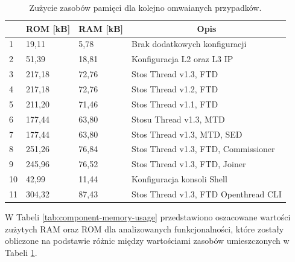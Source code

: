     \begin{table}[H]
        \centering
        \caption{Zużycie zasobów pamięci dla kolejno omwaianych przypadków.}
        \begin{tabular}{|l|l|l|l|}
            \hline
            \rowcolor{gray!20}
            \multicolumn{1}{|c|}{l.p.} & \multicolumn{1}{c|}{ROM [kB]} & \multicolumn{1}{c|}{RAM [kB]} & \multicolumn{1}{c|}{Opis} \\
            \hline
            1 & 19,11 & 5,78 & Brak dodatkowych konfiguracji\\
            \hline
            2 & 51,39 & 18,81 & Konfiguracja L2 oraz L3 IP\\
            \hline
            3 & 217,18 & 72,76 & Stos Thread v1.3, FTD\\
            \hline
            4 & 217,18 & 72,76 & Stos Thread v1.2, FTD\\
            \hline
            5 & 211,20 & 71,46 & Stos Thread v1.1, FTD\\
            \hline
            6 & 177,44 & 63,80 & Stosu Thread v1.3, MTD\\
            \hline
            7 & 177,44 & 63,80 & Stos Thread v1.3, MTD, SED\\
            \hline
            8 & 251,26 & 76,84 & Stos Thread v1.3, FTD, Commissioner\\
            \hline
            9 & 245,96 & 76,52 & Stos Thread v1.3, FTD, Joiner\\
            \hline
            10 & 42,99 & 11,44 & Konfiguracja konsoli Shell\\
            \hline
            11 & 304,32 & 87,43 & Stos Thread v1.3, FTD Openthread CLI \\
            \hline
        \end{tabular}
        \label{tab:memory-measures}
    \end{table}

    W Tabeli \ref{tab:component-memory-usage} przedstawiono oszacowane wartości zużytych RAM oraz ROM dla analizowanych funkcjonalności, które zostały obliczone na podstawie różnic między wartościami zasobów umieszczonych w Tabeli \ref{tab:memory-measures}.

